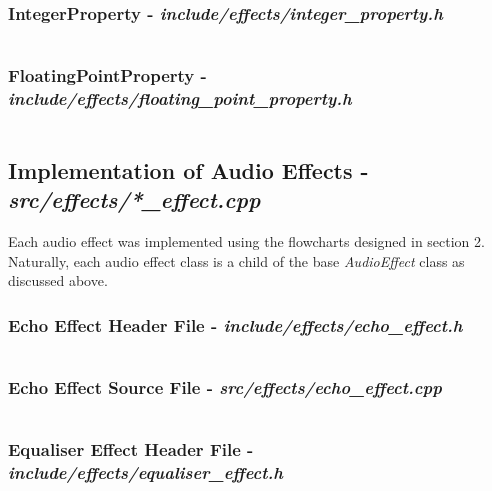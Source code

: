 \pagebreak
\subsubsection{IntegerProperty - \textit{include/effects/integer\_property.h}}
\inputminted[linenos]{c++}{../include/effects/integer_property.h}

\pagebreak
\subsubsection{FloatingPointProperty - \textit{include/effects/floating\_point\_property.h}}
\inputminted[linenos]{c++}{../include/effects/floating_point_property.h}


\pagebreak
\subsection{Implementation of Audio Effects - \textit{src/effects/*\_effect.cpp}}
Each audio effect was implemented using the flowcharts designed in section 2. Naturally, each audio effect class is a child of the base \textit{AudioEffect} class as discussed above.

\subsubsection{Echo Effect Header File - \textit{include/effects/echo\_effect.h}}
\inputminted[linenos]{c++}{../include/effects/echo_effect.h}
\pagebreak
\subsubsection{Echo Effect Source File - \textit{src/effects/echo\_effect.cpp}}
\inputminted[linenos]{c++}{../src/effects/echo_effect.cpp}

\pagebreak
\subsubsection{Equaliser Effect Header File - \textit{include/effects/equaliser\_effect.h}}
\inputminted[linenos]{c++}{../include/effects/equaliser_effect.h}
\pagebreak
